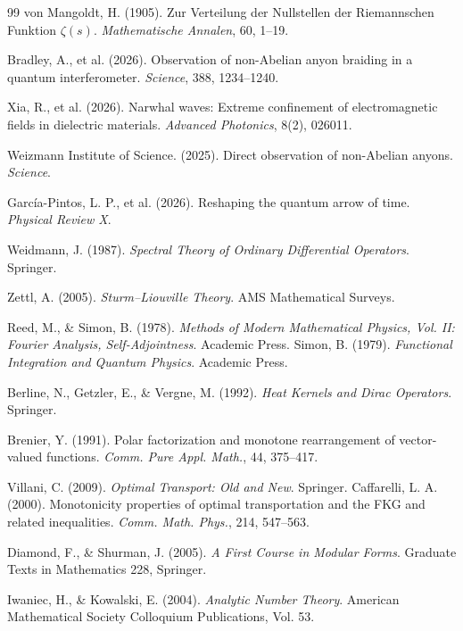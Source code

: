 \documentclass[11pt,a4paper]{article}
\begin{document}
\begin{thebibliography}{99}
 von Mangoldt, H. (1905). Zur Verteilung der Nullstellen der Riemannschen Funktion \(\zeta(s)\). \textit{Mathematische Annalen}, 60, 1--19.

 Bradley, A., et al. (2026). Observation of non-Abelian anyon braiding in a quantum interferometer. \textit{Science}, 388, 1234--1240.

 Xia, R., et al. (2026). Narwhal waves: Extreme confinement of electromagnetic fields in dielectric materials. \textit{Advanced Photonics}, 8(2), 026011.

 Weizmann Institute of Science. (2025). Direct observation of non-Abelian anyons. \textit{Science}.

 García-Pintos, L. P., et al. (2026). Reshaping the quantum arrow of time. \textit{Physical Review X}.

 Weidmann, J. (1987). \textit{Spectral Theory of Ordinary Differential Operators}. Springer.

 Zettl, A. (2005). \textit{Sturm--Liouville Theory}. AMS Mathematical Surveys.

 Reed, M., \& Simon, B. (1978). \textit{Methods of Modern Mathematical Physics, Vol. II: Fourier Analysis, Self-Adjointness}. Academic Press.
 Simon, B. (1979). \textit{Functional Integration and Quantum Physics}. Academic Press.

 Berline, N., Getzler, E., \& Vergne, M. (1992). \textit{Heat Kernels and Dirac Operators}. Springer.

 Brenier, Y. (1991). Polar factorization and monotone rearrangement of vector-valued functions. \textit{Comm. Pure Appl. Math.}, 44, 375--417.

 Villani, C. (2009). \textit{Optimal Transport: Old and New}. Springer.
 Caffarelli, L. A. (2000). Monotonicity properties of optimal transportation and the FKG and related inequalities. \textit{Comm. Math. Phys.}, 214, 547--563.

 Diamond, F., \& Shurman, J. (2005). \textit{A First Course in Modular Forms}. Graduate Texts in Mathematics 228, Springer.

 Iwaniec, H., \& Kowalski, E. (2004). \textit{Analytic Number Theory}. American Mathematical Society Colloquium Publications, Vol. 53.

\end{thebibliography}
\end{document}
